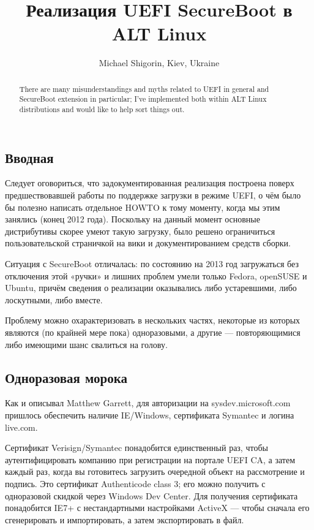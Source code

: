 \documentclass[10pt, a5paper]{article}
\begin{document}
\title{Реализация UEFI SecureBoot в ALT Linux}
\author{Michael Shigorin, Kiev, Ukraine}
\maketitle
\begin{abstract}
There are many misunderstandings and myths related to UEFI in general and SecureBoot extension in particular; I've implemented both within ALT Linux distributions and would like to help sort things out.
\end{abstract}
\subsection*{Вводная}

Следует оговориться, что задокументированная реализация построена поверх предшествовавшей работы по поддержке загрузки в режиме UEFI, о чём было бы полезно написать отдельное HOWTO к тому моменту, когда мы этим занялись (конец 2012 года).  Поскольку на данный момент основные дистрибутивы скорее умеют такую загрузку, было решено ограничиться пользовательской страничкой на вики и документированием средств сборки.

Ситуация с SecureBoot отличалась: по состоянию на 2013 год загружаться без отключения этой «ручки» и лишних проблем умели только Fedora, openSUSE и Ubuntu, причём сведения о реализации оказывались либо устаревшими, либо лоскутными, либо вместе.

Проблему можно охарактеризовать в нескольких частях, некоторые из которых являются (по крайней мере пока) одноразовыми, а другие --- повторяющимися либо имеющими шанс свалиться на голову.

\subsection*{Одноразовая морока}

Как и описывал Matthew Garrett, для авторизации на sysdev.microsoft.com пришлось обеспечить наличие IE/Windows, сертификата Symantec и логина live.com.

Сертификат Verisign/Symantec понадобится единственный раз, чтобы аутентифицировать компанию при регистрации на портале UEFI CA, а затем каждый раз, когда вы готовитесь загрузить очередной объект на рассмотрение и подпись. Это сертификат Authenticode class 3; его можно получить с одноразовой скидкой через Windows Dev Center. Для получения сертификата понадобится IE7+ с нестандартными настройками ActiveX — чтобы сначала его сгенерировать и импортировать, а затем экспортировать в файл.
\end{document}
